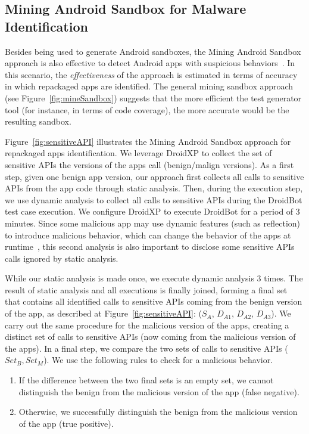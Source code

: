 \subsection{Mining Android Sandbox for Malware Identification}

Besides being used to generate Android sandboxes, the Mining Android Sandbox approach is also effective 
to detect Android apps with suspicious behaviors~\cite{DBLP:conf/wcre/BaoLL18}.  In this scenario, the \emph{effectiveness} of the approach
is estimated in terms of accuracy in which repackaged apps are identified.
The general mining sandbox approach (see Figure~\ref{fig:mineSandbox}) suggests
that the more efficient the test generator tool (for instance, in terms of code coverage),
the more accurate would be the resulting sandbox.


Figure~\ref{fig:sensitiveAPI} illustrates the Mining Android Sandbox approach for
repackaged apps identification. We leverage DroidXP to collect the set of sensitive APIs the versions of the apps call (benign/malign versions). As a first step, given one benign app version,
our approach first collects all calls to sensitive APIs from the app code through static analysis. Then, during the execution step,
we use dynamic analysis to collect all calls to sensitive APIs during the DroidBot test case execution. We configure DroidXP to execute DroidBot for a
period of $3$ minutes. Since some malicious app may use dynamic features (such as reflection) to introduce malicious behavior, which can change the behavior of the apps at runtime~\cite{DBLP:journals/spe/ZhangLTX18,DBLP:journals/tosem/LiTX19}, this second analysis is also important to disclose some sensitive APIs calls ignored by static analysis.

While our static analysis is made once, we execute dynamic analysis $3$ times. The result of static analysis and all executions is finally joined, forming a final set that contains all identified calls to sensitive APIs coming from the benign version of the app, as described at Figure~\ref{fig:sensitiveAPI}: ($S_{A}$, $D_{A1}$, $D_{A2}$, $D_{A3}$). We carry out the same procedure for the malicious version of the apps,
creating a distinct set of calls to sensitive APIs (now coming from the malicious version of the apps). In
a final step, we compare the two sets of calls to sensitive APIs ($Set_B, Set_M$). We use the following rules to
check for a malicious behavior. 

\begin{enumerate}
    \item If the difference between the two final sets is an empty set, we cannot distinguish the benign from the malicious version of the app (false negative).
    \item Otherwise, we successfully distinguish the benign from the malicious version of the app (true positive). 
\end{enumerate}

